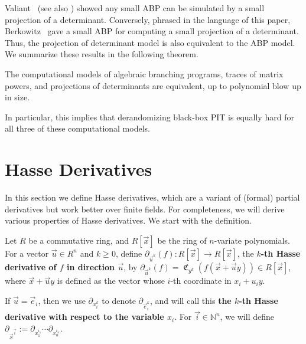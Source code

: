 \documentclass[letterpaper,11pt]{article}
\numberwithin{equation}{section}
\theoremstyle{plain}
\theoremstyle{remark}
\DeclareMathOperator{\coeffo}{\mathfrak{C}}
\newcommand{\coeff}[1]{\coeffo_{#1}}
\newcommand{\N}{\mathbb{N}}
\newcommand{\eqdef}{:=}
\begin{document}
Valiant~\cite{Valiant79a} (see also \cite{MalodPortier08}) showed any small ABP can be simulated by a small projection of a determinant.  Conversely, phrased in the language of this paper, Berkowitz~\cite{Berkowitz84} gave a small ABP for computing a small projection of a determinant.  Thus, the projection of determinant model is also equivalent to the ABP model.  We summarize these results in the following theorem.

\begin{theorem}\label{thm: equivalence}
	The computational models of algebraic branching programs, traces of matrix powers, and projections of determinants are equivalent, up to polynomial blow up in size.
\end{theorem}

In particular, this implies that derandomizing black-box PIT is equally hard for all three of these computational models.

\section{Hasse Derivatives}\label{sec:hasse}

\newcommand{\ply}{R[\vec{x}]}
\newcommand{\partialu}{\partial_{\vec{u}}}
\newcommand{\partialv}{\partial_{\vec{v}}}
\newcommand{\hasse}{\partial}
\newcommand{\hasseu}{\hasse_{\vec{u}^k}}
\newcommand{\hassev}{\hasse_{\vec{v}^\ell}}

In this section we define Hasse derivatives, which are a variant of (formal) partial derivatives but work better over finite fields.  For completeness, we will derive various properties of Hasse derivatives. We start with the definition.

\begin{definition}
	Let $R$ be a commutative ring, and $\ply$ be the ring of $n$-variate polynomials.  For a vector $\vec{u}\in R^n$ and $k\ge 0$, define $\hasseu(f):\ply\to\ply$, the \textbf{$k$-th Hasse derivative of $f$ in direction $\vec{u}$}, by $\hasseu(f)=\coeff{y^k}(f(\vec{x}+\vec{u}y))\in\ply$, where $\vec{x}+\vec{u}y$ is defined as the vector whose $i$-th coordinate in $x_i+u_iy$.

	If $\vec{u}=\vec{e}_i$, then we use $\hasse_{x_i^k}$ to denote $\hasse_{\vec{e}_i^k}$, and will call this \textbf{the $k$-th Hasse derivative with respect to the variable $x_i$}. For $\vec{i}\in\N^n$, we will define $\hasse_{\vec{x}^{\vec{i}}}\eqdef\hasse_{x_1^{i_1}}\cdots\hasse_{x_n^{i_n}}$.
\end{definition}
\end{document}
